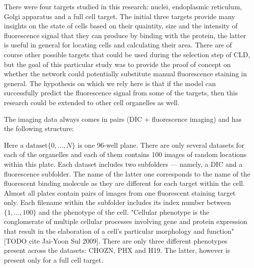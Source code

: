 There were four targets studied in this research: nuclei, endoplasmic reticulum, Golgi apparatus and a full cell target. The initial three targets provide many insights on the state of cells based on their quaintity, size and the intensity of fluorescence signal that they can produce by binding with the protein, the latter is useful in general for locating cells and calculating their area. There are of course other possible targets that could be used during the selection step of CLD, but the goal of this particular study was to provide the proof of concept on whether the network could potentially substitute manual fluorescence staining in general. The hypothesis on which we rely here is that if the model can successfully predict the fluorescence signal from some of the targets, then this research could be extended to other cell organelles as well.

The imaging data always comes in pairs (DIC + fluorescence imaging) and has the following structure:



Here a $\text{dataset}\{0, \ldots, N\}$ is one 96-well plane. There are only several datasets for each of the organelles and each of them contains 100 images of random locations within this plate. Each dataset includes two subfolders --- namely, a DIC and a fluorescence subfolder. The name of the latter one corresponds to the name of the fluorescent binding molecule as they are different for each target within the cell. Almost all plates contain pairs of images from one fluorescent staining target only. Each filename within the subfolder includes its index number between $\{1, \ldots, 100\}$ and the phenotype of the cell. "Cellular phenotype is the conglomerate of multiple cellular processes involving gene and protein expression that result in the elaboration of a cell's particular morphology and function" [TODO cite Jai-Yoon Sul 2009]. There are only three different phenotypes present across the datasets: CHOZN, PHX and H19. The latter, however is present only for a full cell target.

